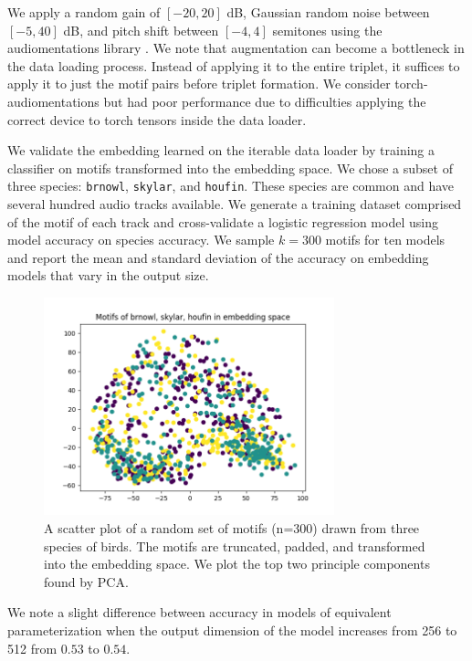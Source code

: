 \documentclass[
]{ceurart}
\begin{document}
We apply a random gain of $[-20, 20]$ dB, Gaussian random noise between $[-5, 40]$ dB, and pitch shift between $[-4, 4]$ semitones using the audiomentations library \cite{audiomentations}. We note that augmentation can become a bottleneck in the data loading process. Instead of applying it to the entire triplet, it suffices to apply it to just the motif pairs before triplet formation. We consider torch-audiomentations but had poor performance due to difficulties applying the correct device to torch tensors inside the data loader.

We validate the embedding learned on the iterable data loader by training a classifier on motifs transformed into the embedding space. We chose a subset of three species: \texttt{brnowl}, \texttt{skylar}, and \texttt{houfin}. These species are common and have several hundred audio tracks available. We generate a training dataset comprised of the motif of each track and cross-validate a logistic regression model using model accuracy on species accuracy. We sample $k=300$ motifs for ten models and report the mean and standard deviation of the accuracy on embedding models that vary in the output size.

\begin{figure}[h]
    \centering
    \includegraphics[width=0.75\textwidth]{figures/interclass.png}
    \caption{A scatter plot of a random set of motifs (n=300) drawn from three species of birds. The motifs are truncated, padded, and transformed into the embedding space. We plot the top two principle components found by PCA. }
    \label{fig:my_label}
\end{figure}

We note a slight difference between accuracy in models of equivalent parameterization when the output dimension of the model increases from 256 to 512 from $0.53$ to $0.54$.
\end{document}
